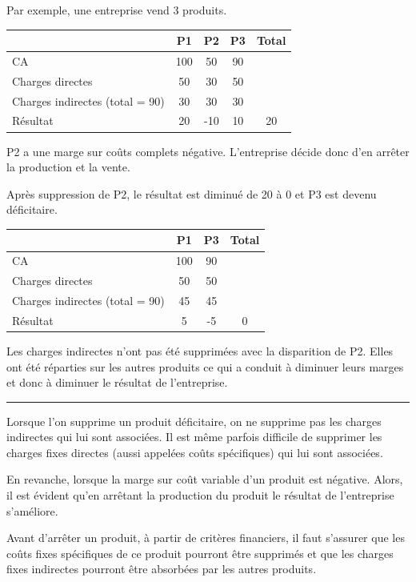 \documentclass[oneside]{kaobook}
\begin{document}
Par exemple, une entreprise vend 3 produits.
\begin{center}
\sidenotesize
\begin{tabular}{l c c c c}
 & P1 & P2 & P3 & Total\\
\hline
CA & 100 & 50 & 90 & \\
Charges directes & 50 & 30 & 50 & \\
Charges indirectes (total = 90) & 30 & 30 & 30 & \\
Résultat & 20 & -10 & 10 & 20\\
\end{tabular}
\end{center}

P2 a une marge sur coûts complets négative. L'entreprise décide donc d'en arrêter la production et la vente.

Après suppression de P2, le résultat est diminué de 20 à 0 et P3 est devenu déficitaire.
\begin{center}
\sidenotesize
\begin{tabular}{l c c c}
 & P1 & P3 & Total\\
\hline
CA & 100 & 90 & \\
Charges directes & 50 & 50 & \\
Charges indirectes (total = 90) & 45 & 45 & \\
Résultat & 5 & -5 & 0\\
\end{tabular}
\end{center}

Les charges indirectes n'ont pas été supprimées avec la disparition de P2. Elles ont été réparties sur les autres produits ce qui a conduit à diminuer leurs marges et donc à diminuer le résultat de l'entreprise.

\noindent\rule{\textwidth}{0.5pt}

Lorsque l'on supprime un produit déficitaire, on ne supprime pas les charges indirectes qui lui sont associées. Il est même parfois difficile de supprimer les charges fixes directes (aussi appelées coûts spécifiques) qui lui sont associées.

En revanche, lorsque la marge sur coût variable d'un produit est négative. Alors, il est évident qu'en arrêtant la production du produit le résultat de l'entreprise s'améliore.

\begin{kaowarn}
Avant d'arrêter un produit, à partir de critères financiers, il faut s'assurer que les coûts fixes spécifiques de ce produit pourront être supprimés et que les charges fixes indirectes pourront être absorbées par les autres produits.
\end{kaowarn}
\end{document}
